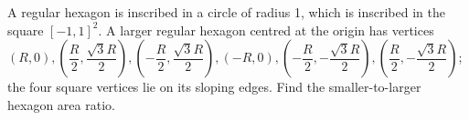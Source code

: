 A regular hexagon is inscribed in a circle of radius 1, which is inscribed in the square $[-1,1]^2$. A larger regular hexagon centred at the origin has vertices $(R,0),(\dfrac{R}{2},\dfrac{\sqrt3R}{2}),(-\dfrac{R}{2},\dfrac{\sqrt3R}{2}),(-R,0),(-\dfrac{R}{2},-\dfrac{\sqrt3R}{2}),(\dfrac{R}{2},-\dfrac{\sqrt3R}{2})$; the four square vertices lie on its sloping edges. Find the smaller-to-larger hexagon area ratio.
